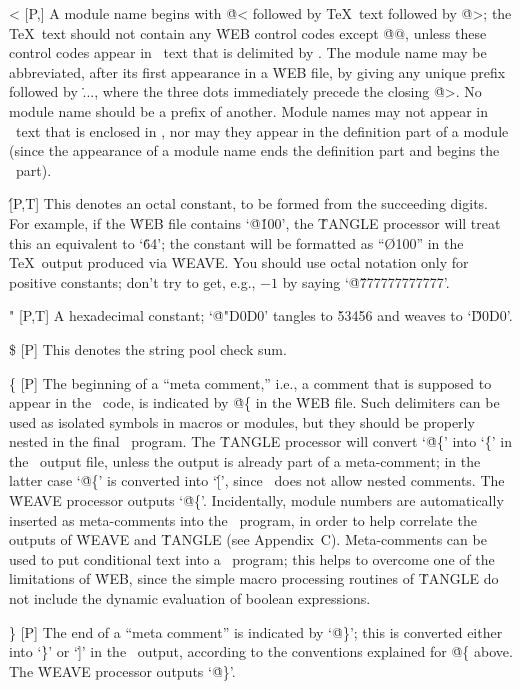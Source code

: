 \@< [P,\oT] A module name begins with \.{@<} followed by \TeX\ text followed
by \.{@>}; the \TeX\ text should not contain any \.{WEB} control codes
except \.{@@}, unless these control codes appear in \PASCAL\ text that
is delimited by \pb. The module name may be abbreviated, after its first
appearance in a \.{WEB} file, by giving any unique prefix followed by \.{...},
where the three dots immediately precede the closing \.{@>}. No module name
should be a prefix of another. Module names may not appear in \PASCAL\
text that is enclosed in \pb, nor may they appear in the definition part
of a module (since the appearance of a module name ends the definition
part and begins the \PASCAL\ part).

\@\' [P,T] This denotes an octal constant, to be formed from the
succeeding digits. For example, if the \.{WEB} file contains `\.{@\'100}',
the \.{TANGLE} processor will treat this an equivalent to `\.{64}';
the constant will be formatted as ``\O{100}'' in the \TeX\ output
produced via \.{WEAVE}. You should use octal notation only for positive
constants; don't try to get, e.g., $-1$ by saying `\.{@\'777777777777}'.

\@" [P,T] A hexadecimal constant; `\.{@"D0D0}' tangles to \.{53456} and
weaves to `\H{D0D0}'.

\@\$ [P] This denotes the string pool check sum.

\@\{ [P] The beginning of a ``meta comment,'' i.e., a comment
that is supposed to appear in the \PASCAL\ code, is indicated by
\.{@\{} in the \.{WEB} file. Such delimiters can be used as
isolated symbols in macros or modules, but they should be properly nested
in the final \PASCAL\ program. The \.{TANGLE} processor will convert
`\.{@\{}' into `\.\{' in the \PASCAL\ output file, unless
the output is already part of a meta-comment; in the latter case
`\.{@\{}' is converted into `\.[', since \PASCAL\ does not allow
nested comments. The \.{WEAVE} processor outputs `\.{@\{}'.
Incidentally, module numbers are automatically inserted
as meta-comments into the \PASCAL\ program, in order to help correlate the
outputs of \.{WEAVE} and \.{TANGLE} (see Appendix~C\null). Meta-comments
can be used to put conditional text into a \PASCAL\ program; this helps to
overcome one of the limitations of \.{WEB}, since the simple macro
processing routines of \.{TANGLE} do not include the dynamic evaluation of
boolean expressions.

\@\} [P] The end of a ``meta comment'' is indicated by `\.{@\}}'; this is
converted either into `\.\}' or `\.{]}' in the \PASCAL\ output, according
to the conventions explained for \.{@\{} above.
The \.{WEAVE} processor outputs `\.{@\}}'.

